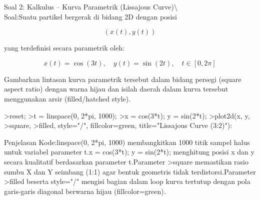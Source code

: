 \documentclass[a4paper,10pt]{article}
\begin{document}
\begin{eulernotebook}
\begin{eulercomment}
\begin{eulercomment}
\begin{eulercomment}
\begin{eulercomment}
\begin{eulercomment}
\begin{eulercomment}
\begin{eulercomment}
Soal 2: Kalkulus – Kurva Parametrik (Lissajous Curve)\textbackslash{}\\
Soal:Suatu partikel bergerak di bidang 2D dengan posisi \\
\end{eulercomment}
\begin{eulerformula}
\[
(x(t), y(t))
\]
\end{eulerformula}
\begin{eulercomment}
yang terdefinisi secara parametrik oleh:\\
\end{eulercomment}
\begin{eulerformula}
\[
x(t) = \cos(3t), \quad y(t) = \sin(2t), \quad t \in [0, 2\pi]
\]
\end{eulerformula}
\begin{eulercomment}
Gambarkan lintasan kurva parametrik tersebut dalam bidang persegi
(square aspect ratio) dengan warna hijau dan isilah daerah dalam kurva
tersebut menggunakan arsir (filled/hatched style).
\end{eulercomment}
\begin{eulerprompt}
>reset;
>t = linspace(0, 2*pi, 1000);
>x = cos(3*t); y = sin(2*t);
>plot2d(x, y, >square, >filled, style="/", fillcolor=green, title="Lissajous Curve (3:2)"):
\end{eulerprompt}
\begin{eulercomment}
Penjelasan Kode:linspace(0, 2*pi, 1000) membangkitkan 1000 titik
sampel halus untuk variabel parameter t.x = cos(3*t); y = sin(2*t);
menghitung posisi x dan y secara kualitatif berdasarkan parameter
t.Parameter \textgreater{}square memastikan rasio sumbu \textdollar{}X\textdollar{} dan \textdollar{}Y\textdollar{} seimbang (1:1)
agar bentuk geometris tidak terdistorsi.Parameter \textgreater{}filled beserta
style="/" mengisi bagian dalam loop kurva tertutup dengan pola
garis-garis diagonal berwarna hijau (fillcolor=green).


\end{eulercomment}
\end{eulercomment}
\end{eulercomment}
\end{eulercomment}
\end{eulercomment}
\end{eulercomment}
\end{eulercomment}
\end{eulernotebook}
\end{document}
